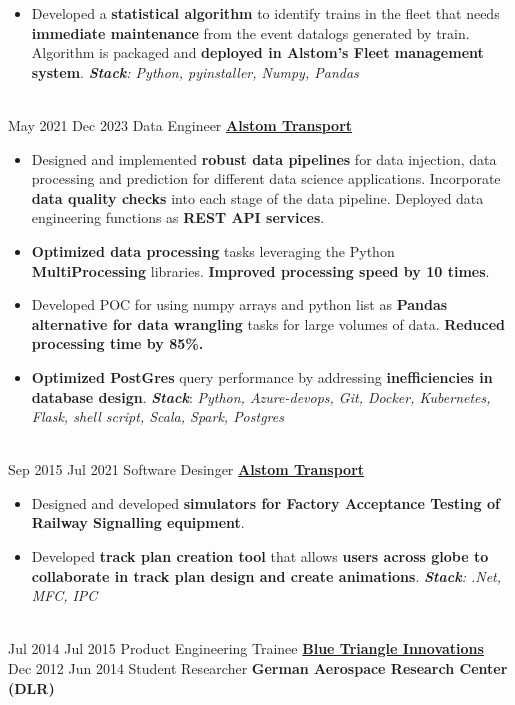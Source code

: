 \documentclass[letterpaper]{DS_class_file} %
\begin{document}
\begin{twenty}
{\begin{itemize}
        \item Developed a \textbf{statistical algorithm} to identify trains in the fleet that needs \textbf{immediate maintenance} from the event datalogs generated by train. Algorithm is packaged and \textbf{deployed in Alstom's Fleet management system}. \newline \textit{\textbf{Stack}: Python, pyinstaller, Numpy, Pandas}
		\end{itemize}}
		\\
	\twentyitem
		{May 2021}
		{Dec 2023}
		{\hspace{0.3cm}Data Engineer}
		{\href{https://www.alstom.com/alstom-india}{\textbf{Alstom Transport}}}
		{}
		{\begin{itemize}
			\item Designed and implemented \textbf{robust data pipelines} for data injection, data processing and prediction for different data science applications. Incorporate \textbf{data quality checks} into each stage of the data pipeline. Deployed data engineering functions as \textbf{REST API services}.  
   \item \textbf{Optimized data processing} tasks leveraging the Python \textbf{MultiProcessing} libraries. \textbf{Improved processing speed by 10 times}. 
   \item Developed POC for using numpy arrays and python list as \textbf{Pandas alternative for data wrangling} tasks for large volumes of data. \textbf{Reduced processing time by 85\%.}      
   \item \textbf{Optimized PostGres} query performance by addressing \textbf{inefficiencies in database design}. \newline \textit{\textbf{Stack}}: \textit{Python, Azure-devops, Git, Docker, Kubernetes, Flask, shell script, Scala, Spark, Postgres } 
		\end{itemize}}
    \\
	\twentyitem
		{Sep 2015}
		{Jul 2021}
		{\hspace{0.3cm}Software Desinger}
		{\href{https://www.alstom.com/alstom-india}{\textbf{Alstom Transport}}}
		{}
		{\begin{itemize}
			\item Designed and developed \textbf{simulators for Factory Acceptance Testing of Railway Signalling equipment}.
			\item Developed \textbf{track plan creation tool} that allows \textbf{users across globe to collaborate in track plan design and create animations}. \newline \textit{\textbf{Stack}: .Net, MFC, IPC}
		\end{itemize}}
	\\
	\twentyitem
		{Jul 2014}
		{Jul 2015}
		{\hspace{0.3cm}Product Engineering Trainee}
		{\href{}{\textbf{Blue Triangle Innovations}}}
		{}
		{}
		\\
	\twentyitem
    	{Dec 2012}
		{Jun 2014}
        {\hspace{0.3cm} Student Researcher}
        {\textbf{German Aerospace Research Center (DLR)}}
        {}
        {}
\end{twenty}
\end{document}
